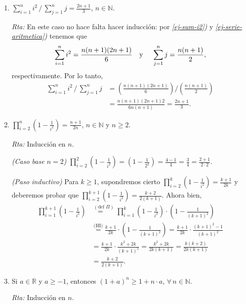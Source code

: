 \documentclass[12pt,spanish,makeidx]{amsbook}
\newcommand{\rta}{\noindent\textit{Rta: }}
\begin{document}
\begin{enumerate}
\begin{enumerate}
			\item $\displaystyle{ \sum_{i=1}^n i^2\, /\, \sum_{j=1}^n j = \frac{2n+1}{3}}$, $n\in \mathbb N$.
			
			\rta En  este caso no hace falta hacer inducción: por \textit{ \ref{ej-sum-i2})} y \textit{\ref{ej-serie-aritmetica})} tenemos que 
			\begin{equation*}
				\sum_{i=1}^n i^2 = \frac{n(n+1)(2n+1)}{6} \text{\quad y \quad} \sum_{j=1}^n j = \frac{n(n+1)}{2},
			\end{equation*}
			respectivamente. Por  lo tanto, 
			\begin{align*}
				\sum_{i=1}^n i^2\, /\, \sum_{j=1}^n j &= \left(\frac{n(n+1)(2n+1)}{6}\right) / \left(\frac{n(n+1)}{2}\right) \\
				&= \frac{n(n+1)(2n+1)2}{6n(n+1)} = \frac{2n+1}{3}.
			\end{align*}
			
			
			\item $\displaystyle{ \prod_{i=2}^n \left(1-\frac{1}{i^2}\right) = \frac{n+1}{2n}}$, $n\in \mathbb N$ y $ n\ge 2$.
			
			\rta Inducción en $n$.
			
			\textit{(Caso base $n=2$) } $\prod_{i=2}^2 \left(1-\frac{1}{i^2}\right) = (1- \frac{1}{2^2}) = \frac{4-1}{4} = \frac{3}{4} = \frac{2+1}{2 \cdot 2}$.
			
			\textit{(Paso inductivo) } Para  $k \ge 1$,  supondremos cierto $\prod_{i=2}^k \left(1-\frac{1}{i^2}\right) = \frac{k+1}{2k}$ y  deberemos probar  que $\prod_{i=2}^{k+1} \left(1-\frac{1}{i^2}\right) = \frac{k+2}{2(k+1)}$. Ahora bien,
			\begin{align*}
			\prod_{i=1}^{k+1}\left(1-\frac{1}{i^2}\right) &\overset{(\text{def } \Pi)}{=\quad} \prod_{i=1}^k \left(1-\frac{1}{i^2}\right) \cdot \left(1-\frac{1}{(k+1)^2}\right)\\ &\overset{\text{(HI)}}{=}  \frac{k+1}{2k} \cdot\left(1-\frac{1}{(k+1)^2}\right)
			=  \frac{k+1}{2k} \cdot\frac{(k+1)^2- 1}{(k+1)^2} \\
			&= \frac{k+1}{2k} \cdot\frac{k^2+2k}{(k+1)^2} = \frac{k^2+2k}{2k (k+1)} = \frac{k(k+2)}{2k (k+1)} \\
			&=  \frac{k+2}{2 (k+1)}.
			\end{align*}
			
			\item Si $a\in \mathbb R$ y $a\geq -1$, entonces $(1+a)^n\geq 1+n\cdot a$, $\forall \, n \in \mathbb N$.
			
			\rta Inducción en $n$.
			

\end{enumerate}
\end{enumerate}
\end{document}

